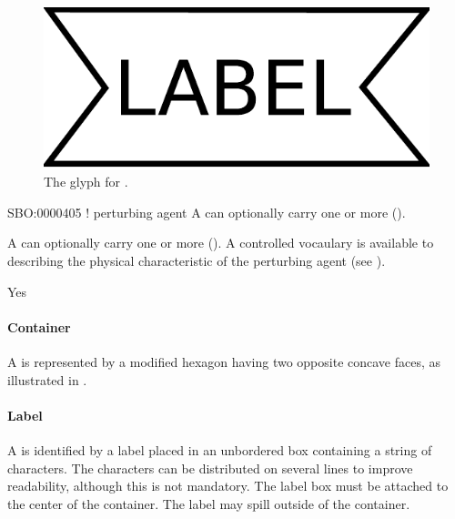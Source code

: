 \begin{figure}[H]
  \centering
  \includegraphics[scale = 0.3]{images/perturbing_agent}
  \caption{The \PD glyph for .}
  \label{fig:perturbing agent}
\end{figure}

\begin{glyphDescription}
\glyphSboTerm SBO:0000405 ! perturbing agent
\glyphAux A  can optionally carry one or more  ().
\glyphRules%
\begin{inparaenum}
\item A  can optionally carry one or more  ().  A controlled vocaulary is available to describing the physical characteristic of the perturbing agent (see ).  
\end{inparaenum}
\glyphCloning Yes
\end{glyphDescription}

\paragraph{Container}

A  is represented by a modified hexagon
having two opposite concave faces, as illustrated in .

\paragraph{Label}

A  is identified by a label placed in an
unbordered box containing a string of characters.  The characters can be
distributed on several lines to improve readability, although this is not
mandatory.  The label box must be attached to the center of the
 container.  The label may spill outside of the container.

